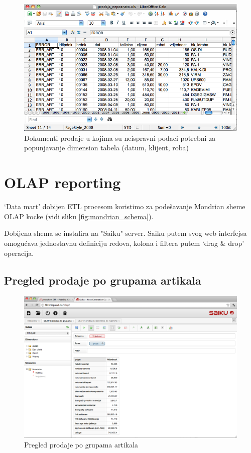 \documentclass[times, utf8, seminar]{fit}
\begin{document}
\begin{figure}[H]
\centering
\includegraphics[width=15cm]{img/nepoznato_prodaja.png}
\caption{Dokumenti prodaje u kojima su neispravni podaci potrebni za popunjavanje dimension tabela (datum, klijent, roba) }
\end{figure}


\section{OLAP reporting} 

`Data mart' dobijen ETL procesom koristimo za podešavanje Mondrian sheme OLAP kocke (vidi sliku \ref{fig:mondrian_schema}). 

Dobijena shema se instalira na "Saiku" server. Saiku putem svog web interfejsa omogućava jednostavnu definiciju redova, kolona i filtera putem `drag \& drop' operacija.
   

\subsection{Pregled prodaje po grupama artikala}


\begin{figure}[H]
\centering
\includegraphics[width=15cm]{img/saiku_rpt_grupe}
\caption{Pregled prodaje po grupama artikala}
\end{figure}
\end{document}
